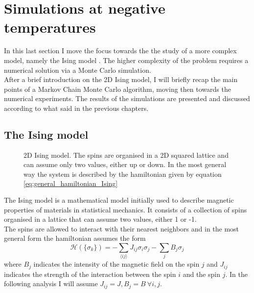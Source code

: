 \chapter{Simulations at negative temperatures}
\label{ch:ising}

In this last section I move the focus towards the the study of a more complex model, namely the Ising model \cite{ising}. The higher complexity of the problem requires a numerical solution
via a Monte Carlo simulation. \\
After a brief introduction on the 2D Ising model, I will briefly recap the main points of a Markov Chain Monte Carlo algorithm, moving then towards the numerical experiments. The results of the
simulations are presented and discussed according to what said in the previous chapters. \\
\section{The Ising model}
\begin{figure}[htbp]
    \centering
    \caption{2D Ising model. The spins are organised in a 2D squared lattice and can assume only two values, either up or down. In the most general way the system is described by the hamiltonian given by equation \ref{eq:general_hamiltonian_Ising}}
    \label{fig:IsingLattice}
\end{figure}
The Ising model is a mathematical model initially used to describe magnetic properties of materials in statistical mechanics. It consists of a collection of spins 
organised in a lattice that can assume two values, either 1 or -1. \\
The spins are allowed to interact with their nearest neighbors and in the most general form the hamiltonian assumes the form
\begin{equation}
    \mathcal{H}(\{\sigma_k\}) = -\sum_{\langle i j\rangle} J_{i j} \sigma_{i} \sigma_{j} - \sum_{j} B_j\sigma_{j}
    \label{eq:general_hamiltonian_Ising}
\end{equation}
where $B_j$ indicates the intensity of the magnetic field on the spin $j$ and $J_{ij}$ indicates the strength of the interaction between the spin $i$ and the spin $j$.
In the following analysis I will assume $J_{ij} = J, B_j = B \ \forall i,j$. \\
